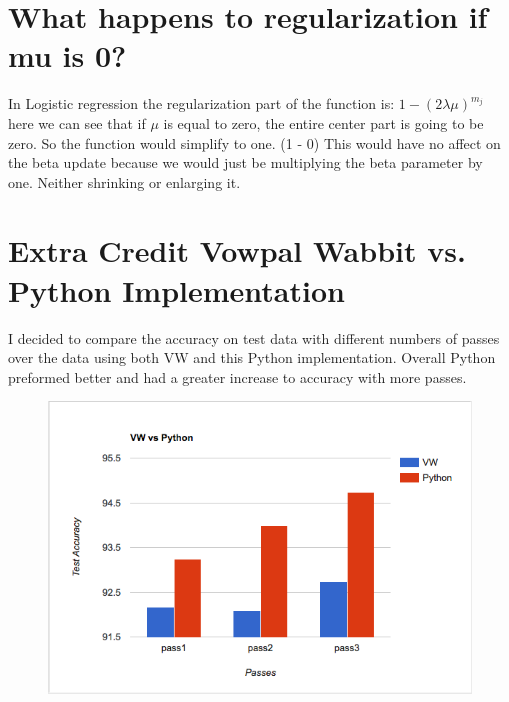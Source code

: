 \documentclass{article}
\begin{document}
\section{What happens to regularization if mu is 0?}
In Logistic regression the regularization part of the function is:  $1 - (2\lambda\mu)^{m_j}$ here we can see that if $\mu$ is equal to zero, the entire center part is going to be zero. So the function would simplify to one. (1 - 0) This would have no affect on the beta update because we would just be multiplying the beta parameter by one. Neither shrinking or enlarging it. 

\section{Extra Credit Vowpal Wabbit vs. Python Implementation}
I decided to compare the accuracy on test data with different numbers of passes over the data using both VW and this Python implementation. Overall Python preformed better and had a greater increase to accuracy with more passes. 

\begin{figure}
\includegraphics[scale=0.45]{graph}
\end{figure}

\nocite{langley00}



\end{document}

